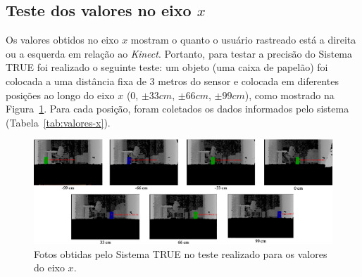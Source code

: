 \subsection{Teste dos valores no eixo $\displaystyle x$}

	Os valores obtidos no eixo $\displaystyle x$ mostram o quanto o usuário rastreado está a direita ou a esquerda em relação ao \textit{Kinect}. Portanto, para testar a precisão do Sistema TRUE foi realizado o seguinte teste: um objeto (uma caixa de papelão) foi colocada a uma distância fixa de 3 metros do sensor e colocada em diferentes posições ao longo do eixo $\displaystyle x$ (0, $\displaystyle \pm33 cm$, $\displaystyle \pm66 cm$, $\displaystyle \pm99 cm$), como mostrado na Figura~\ref{fig:eixox-imgs}. Para cada posição, foram coletados os dados informados pelo sistema (Tabela~\ref{tab:valores-x}). 


	\begin{figure}[htb]
		\begin{center}
			\includegraphics[scale=0.45]{figuras/5.Testes/eixox-imgs2.png}
		\end{center}
		\caption{Fotos obtidas pelo Sistema TRUE no teste realizado para os valores do eixo $\displaystyle x$.}
		\label{fig:eixox-imgs}
	\end{figure}


